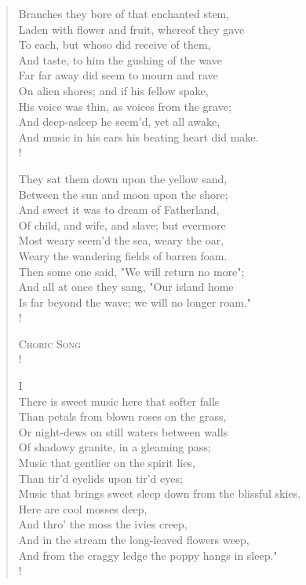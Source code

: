 \documentclass[10pt]{memoir}
\begin{document}
\begin{verse}
Branches they bore of that enchanted stem,\\
Laden with flower and fruit, whereof they gave\\
To each, but whoso did receive of them,\\
And taste, to him the gushing of the wave\\
Far far away did seem to mourn and rave\\
On alien shores; and if his fellow spake,\\
His voice was thin, as voices from the grave;\\
And deep-asleep he seem'd, yet all awake,\\
And music in his ears his beating heart did make.\\!

They sat them down upon the yellow sand,\\
Between the sun and moon upon the shore;\\
And sweet it was to dream of Fatherland,\\
Of child, and wife, and slave; but evermore\\
Most weary seem'd the sea, weary the oar,\\
Weary the wandering fields of barren foam.\\
Then some one said, "We will return no more";\\
And all at once they sang, "Our island home\\
Is far beyond the wave; we will no longer roam."\\!

\textsc{Choric Song}\\!

I\\
There is sweet music here that softer falls\\
Than petals from blown roses on the grass,\\
Or night-dews on still waters between walls\\
Of shadowy granite, in a gleaming pass;\\
Music that gentlier on the spirit lies,\\
Than tir'd eyelids upon tir'd eyes;\\
Music that brings sweet sleep down from the blissful skies.\\
Here are cool mosses deep,\\
And thro' the moss the ivies creep,\\
And in the stream the long-leaved flowers weep,\\
And from the craggy ledge the poppy hangs in sleep."\\!


\end{verse}
\end{document}
